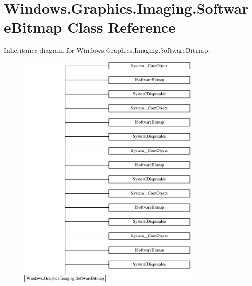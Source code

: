 \hypertarget{class_windows_1_1_graphics_1_1_imaging_1_1_software_bitmap}{}\section{Windows.\+Graphics.\+Imaging.\+Software\+Bitmap Class Reference}
\label{class_windows_1_1_graphics_1_1_imaging_1_1_software_bitmap}
Inheritance diagram for Windows.\+Graphics.\+Imaging.\+Software\+Bitmap\+:\begin{figure}[H]
\begin{center}
\leavevmode
\includegraphics[height=12.000000cm]{class_windows_1_1_graphics_1_1_imaging_1_1_software_bitmap}
\end{center}
\end{figure}
